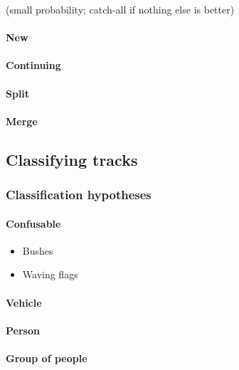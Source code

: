 \documentclass{book}
\begin{document}
(small probability; catch-all if nothing else is better)

\paragraph{New}

\paragraph{Continuing}

\paragraph{Split}

\paragraph{Merge}

\subsection{Classifying tracks}

\subsubsection{Classification hypotheses}
\label{sec:classification-hypotheses}

\paragraph{Confusable}

\begin{itemize}
    \item Bushes
    \item Waving flags
\end{itemize}

\paragraph{Vehicle}

\paragraph{Person}

\paragraph{Group of people}
\end{document}
